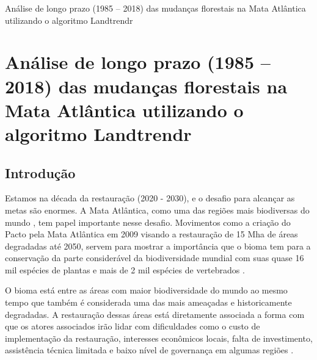 \begin{titlepage}
    \centering
    \vspace*{\fill}

    \vspace*{0.5cm}

    \Large%
    Análise de longo prazo (1985 – 2018) das mudanças florestais na Mata Atlântica utilizando o algoritmo Landtrendr

    \vspace*{5cm}


    \vspace*{\fill}
\end{titlepage}

\section{Análise de longo prazo (1985 – 2018) das mudanças florestais na Mata Atlântica utilizando o algoritmo Landtrendr}


\subsection{Introdução}
\hspace{13pt} Estamos na década da restauração (2020 - 2030), e o desafio para alcançar as metas são enormes. A Mata Atlântica, como uma das regiões mais biodiversas do mundo \citep{REZENDE2018208}, tem papel importante nesse desafio. Movimentos como a criação do Pacto pela Mata Atlântica em 2009 visando a restauração de 15 Mha de áreas degradadas até 2050, servem para mostrar a importância que o bioma tem para a conservação da parte considerável da biodiversidade mundial com suas quase 16 mil espécies de plantas e mais de 2 mil espécies de vertebrados \citep{scarano2014}.  

O bioma está entre as áreas com maior biodiversidade do mundo ao mesmo tempo que também é considerada uma das mais ameaçadas e historicamente degradadas. A restauração dessas áreas está diretamente associada a forma com que os atores associados irão lidar com dificuldades como o custo de implementação da restauração, interesses econômicos locais, falta de investimento, assistência técnica limitada e baixo nível de governança em algumas regiões \citep{strassburg_strategic_2019, CROUZEILLES2019, Chazdon2017, Strassburg2020}. 

